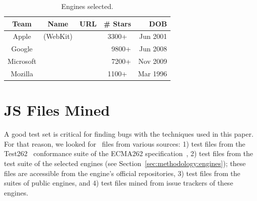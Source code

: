 \documentclass[sigconf,review, anonymous]{acmart}
\begin{document}
\begin{table}[t]
  \small
  \centering
  \caption{\label{tab:engines}Engines selected.}
  \begin{tabular}{cccrr}
    \toprule
    Team & Name & URL & \# Stars  & DOB \\
    \midrule
    Apple & \jsc{} (WebKit) & \cite{jsc2018repo} &
    \multicolumn{1}{c}{3300+} & Jun 2001\\
    Google & \veight{} & \cite{v82018repo} & 9800+ & Jun 2008\\
    Microsoft & \chakra{} & \cite{chakra2018repo} & 7200+ & Nov 2009\\
    Mozilla & \smonkey{} & \cite{spidermonkey2018repo} &
    \multicolumn{1}{c}{1100+} & Mar 1996\\
   \bottomrule     
  \end{tabular}
\end{table}

\section{JS Files Mined}
\label{sec:seeds}
A good test set is critical for finding bugs with the techniques used
in this paper. For that reason, we looked for \js\ files from various
sources: 1) test files from the Test262~\cite{tc39-github} conformance
suite of the ECMA262 specification~\cite{ecmas262-spec}, 2) test files
from the test suite of the selected engines (see
Section~\ref{sec:methodology:engines}); these files are accessible
from the engine's official repositories, 3) test files from the suites
of public engines, and 4) test files mined from issue trackers of
these engines.

\end{document}
